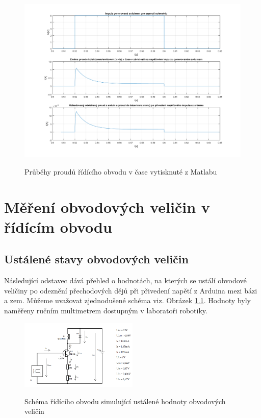 \documentclass[12pt,oneside]{book} %
\begin{document}
\begin{figure}[ht] \large\centering
\includegraphics[width=1.00\textwidth]{./img/prubehy.png}\\[1cm] 
\caption{Průběhy proudů řídícího obvodu v čase vytisknuté z Matlabu}
\label{prubehy}
\end{figure} 

\chapter{Měření obvodových veličin v řídícím obvodu}\label{mer_elektro}
\section{Ustálené stavy obvodových veličin}
\qquad Následující odstavec dává přehled o hodnotách, na kterých se ustálí obvodové veličiny po odeznění přechodových dějů při přivedení napětí z Arduina mezi bázi a zem. Můžeme uvažovat zjednodušené schéma viz. Obrázek \ref{schema1}. Hodnoty byly naměřeny ručním multimetrem dostupným v laboratoři robotiky.
\begin{figure}[ht] \large\centering
\includegraphics[width=0.50\textwidth]{./img/schema1.png}\\[1cm] 
\caption{Schéma řídícího obvodu simulující ustálené hodnoty obvodových veličin}
\label{schema1}
\end{figure} 
\end{document}
